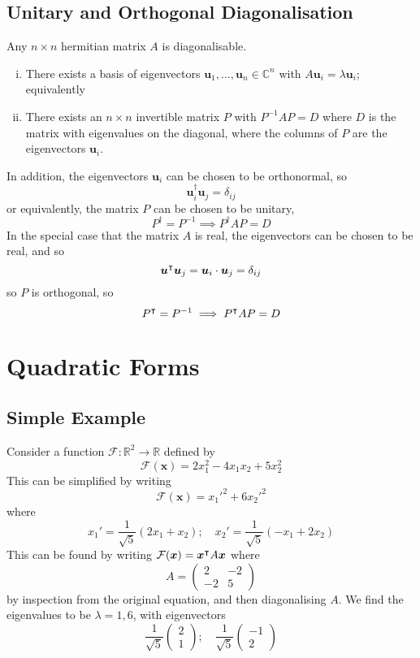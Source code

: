 \documentclass{article}
\begin{document}
	\subsection{Unitary and Orthogonal Diagonalisation}
	\begin{theorem}
		Any $n\times n$ hermitian matrix $A$ is diagonalisable.
		\begin{enumerate}[(i)]
			\item There exists a basis of eigenvectors $\bm u_1, \dots, \bm u_n \in \mathbb C^n$ with $A\bm u_i = \lambda \bm u_i$; equivalently
			\item There exists an $n \times n$ invertible matrix $P$ with $P^{-1}AP = D$ where $D$ is the matrix with eigenvalues on the diagonal, where the columns of $P$ are the eigenvectors $\bm u_i$.
		\end{enumerate}
		In addition, the eigenvectors $\bm u_i$ can be chosen to be orthonormal, so
		\[ \bm u^\dagger_i \bm u_j = \delta_{ij} \]
		or equivalently, the matrix $P$ can be chosen to be unitary,
		\[ P^\dagger = P^{-1} \implies P^\dagger AP = D \]
		In the special case that the matrix $A$ is real, the eigenvectors can be chosen to be real, and so
		\[ \bm u^\intercal \bm u_j = \bm u_i \cdot \bm u_j = \delta_{ij} \]
		so $P$ is orthogonal, so
		\[ P^\intercal = P^{-1} \implies P^\intercal AP = D \]
	\end{theorem}

	\section{Quadratic Forms}
	\subsection{Simple Example}
	Consider a function $\mathcal F\colon \mathbb R^2 \to \mathbb R$ defined by
	\[ \mathcal F(\bm x) = 2x_1^2 - 4x_1x_2 + 5x_2^2 \]
	This can be simplified by writing
	\[ \mathcal F(\bm x) = x_1'^2 + 6x_2'^2 \]
	where
	\[ x_1' = \frac{1}{\sqrt 5}(2x_1 + x_2);\quad x_2' = \frac{1}{\sqrt 5}(-x_1 + 2x_2) \]
	This can be found by writing $\mathcal F(\bm x) = \bm x^\intercal A\bm x$ where
	\[ A = \begin{pmatrix}
		2 & -2 \\ -2 & 5
	\end{pmatrix} \]
	by inspection from the original equation, and then diagonalising $A$. We find the eigenvalues to be $\lambda = 1, 6$, with eigenvectors
	\[ \frac{1}{\sqrt 5} \begin{pmatrix}
		2 \\ 1
	\end{pmatrix};\quad \frac{1}{\sqrt 5}\begin{pmatrix}
		-1 \\ 2
	\end{pmatrix} \]
\end{document}
